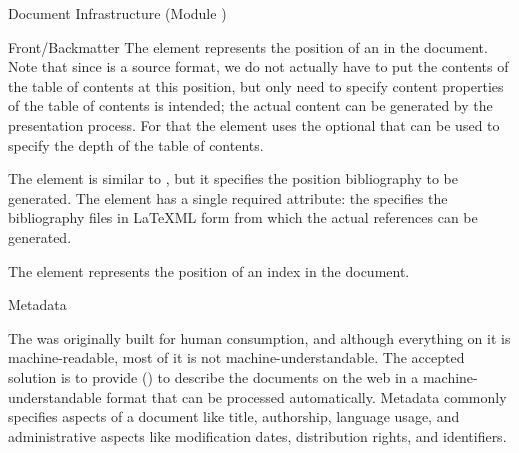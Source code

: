 \begin{tchapter}[id=omdoc-infrastructure,short=Document Infrastructure]{Document Infrastructure (Module {})}
\begin{newpart}
\begin{tsection}[id=frontbackmatter]{Front/Backmatter}
  The {} element represents the position of an  in the document. Note that
  since {\omdoc} is a source format, we do not actually have to put the contents of the
  table of contents at this position, but only need to specify content properties of the
  table of contents is intended; the actual content can be generated by the presentation
  process. For that the {} element uses the optional
  {} that can be used to specify the depth of the table
  of contents.

 The {} element is similar to {}, but it specifies the
  position bibliography to be generated. The {} element has a single
  required attribute: the {} specifies the bibliography
  files in LaTeXML form
  from which the actual references can be generated.

  The {} element represents the position of an index in the
  document.
\end{tsection}
\end{newpart}

\begin{tsection}[id=metadata]{Metadata}
  
  The {} was originally built for human consumption, and although everything
  on it is machine-readable, most of it is not machine-understandable.  The accepted
  solution is to provide {} ({}) to describe
  the documents on the web in a machine-understandable format that can be processed
  automatically. Metadata commonly specifies aspects of a document like title, authorship,
  language usage, and administrative aspects like modification dates, distribution rights,
  and identifiers.
  

\end{tsection}
\end{tchapter}
